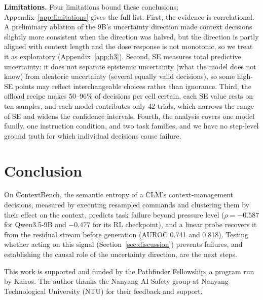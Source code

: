 \documentclass{article}
\begin{document}
\textbf{Limitations.} Four limitations bound these conclusions; Appendix~\ref{app:limitations} gives the full list.
First, the evidence is correlational.
A preliminary ablation of the 9B's uncertainty direction \citep{arditi2024refusal} made context decisions slightly more consistent when the direction was halved, but the direction is partly aligned with context length and the dose response is not monotonic, so we treat it as exploratory (Appendix~\ref{app:h3}).
Second, SE measures total predictive uncertainty: it does not separate epistemic uncertainty (what the model does not know) from aleatoric uncertainty (several equally valid decisions), so some high-SE points may reflect interchangeable choices rather than ignorance.
Third, the offload recipe makes 50--96\% of decisions per cell certain, each SE value rests on ten samples, and each model contributes only 42 trials, which narrows the range of SE and widens the confidence intervals.
Fourth, the analysis covers one model family, one instruction condition, and two task families, and we have no step-level ground truth for which individual decisions cause failure.

\section{Conclusion}

On ContextBench, the semantic entropy of a CLM's context-management decisions, measured by executing resampled commands and clustering them by their effect on the context, predicts task failure beyond pressure level ($\rho=-0.587$ for Qwen3.5-9B and $-0.477$ for its RL checkpoint), and a linear probe recovers it from the residual stream before generation (AUROC 0.741 and 0.818).
Testing whether acting on this signal (Section~\ref{sec:discussion}) prevents failures, and establishing the causal role of the uncertainty direction, are the next steps.


\begin{ack}
  This work is supported and funded by the Pathfinder Fellowship, a program run by Kairos.
  The author thanks the Nanyang AI Safety group at Nanyang Technological University (NTU) for their feedback and support.
\end{ack}

\clearpage



\clearpage
\appendix
\end{document}
